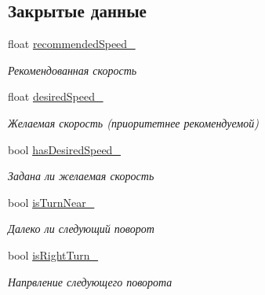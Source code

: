 \subsection*{Закрытые данные}
\begin{DoxyCompactItemize}
\item 
\mbox{\label{classrtm_1_1_car_object_aeacdd9e29292eb69f5af3cef31aa02f7}} 
float \hyperlink{classrtm_1_1_car_object_aeacdd9e29292eb69f5af3cef31aa02f7}{recommended\+Speed\+\_\+}
\begin{DoxyCompactList}\small\item\em Рекомендованная скорость \end{DoxyCompactList}\item 
\mbox{\label{classrtm_1_1_car_object_a1f90afc8d2b0787b7db6b183cb58159d}} 
float \hyperlink{classrtm_1_1_car_object_a1f90afc8d2b0787b7db6b183cb58159d}{desired\+Speed\+\_\+}
\begin{DoxyCompactList}\small\item\em Желаемая скорость (приоритетнее рекомендуемой) \end{DoxyCompactList}\item 
\mbox{\label{classrtm_1_1_car_object_a4b41298c7c17d671a0676cafebf76543}} 
bool \hyperlink{classrtm_1_1_car_object_a4b41298c7c17d671a0676cafebf76543}{has\+Desired\+Speed\+\_\+}
\begin{DoxyCompactList}\small\item\em Задана ли желаемая скорость \end{DoxyCompactList}\item 
\mbox{\label{classrtm_1_1_car_object_afedeeee4a90fe5febf5e164537cd9e3c}} 
bool \hyperlink{classrtm_1_1_car_object_afedeeee4a90fe5febf5e164537cd9e3c}{is\+Turn\+Near\+\_\+}
\begin{DoxyCompactList}\small\item\em Далеко ли следующий поворот \end{DoxyCompactList}\item 
\mbox{\label{classrtm_1_1_car_object_ae8dd4d2009bfee2951559f3207e26e1a}} 
bool \hyperlink{classrtm_1_1_car_object_ae8dd4d2009bfee2951559f3207e26e1a}{is\+Right\+Turn\+\_\+}
\begin{DoxyCompactList}\small\item\em Напрвление следующего поворота \end{DoxyCompactList}\item 

\end{DoxyCompactItemize}
